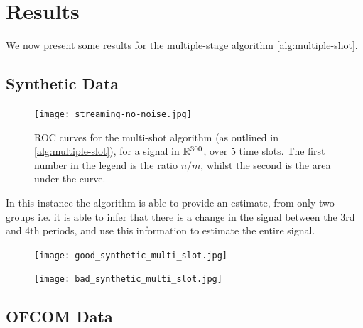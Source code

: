 \section{Results} \label{sec:results}

We now present some results for the multiple-stage algorithm \ref{alg:multiple-shot}.

\subsection{Synthetic Data}

\begin{figure}[h]
\centering
\texttt{[image: streaming-no-noise.jpg]}
\caption{ROC curves for the multi-shot algorithm (as outlined in \ref{alg:multiple-slot}), for a signal in \({\mathbb{R}}^{300}\), over 5 time slots. The first number in the legend is the ratio \(n/m\), whilst the second is the area under the curve. }
\label{multi_slot_different_k}
\end{figure}

In this instance the algorithm is able to provide an estimate, from only two groups i.e. it is able to infer that there is a change in the signal between the 3rd and 4th periods, and use this information to estimate the entire signal. 

\begin{figure}[h]
\centering
\texttt{[image: good\_synthetic\_multi\_slot.jpg]}
\caption{}
\label{good_sythetic_multi}
\end{figure}

\begin{figure}[h]
\centering
\texttt{[image: bad\_synthetic\_multi\_slot.jpg]}
\caption{}
\label{bad_synthetic_multi}
\end{figure}



\subsection{OFCOM Data}